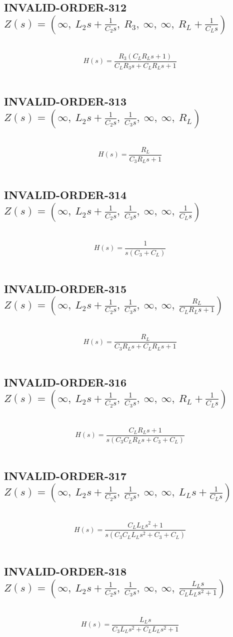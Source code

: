 \documentclass{article}
\begin{document}
\subsection{INVALID-ORDER-312 $Z(s) = \left( \infty, \  L_{2} s + \frac{1}{C_{2} s}, \  R_{3}, \  \infty, \  \infty, \  R_{L} + \frac{1}{C_{L} s}\right)$ } \ 
\textbf{\[H(s) = \frac{R_{3} \left(C_{L} R_{L} s + 1\right)}{C_{L} R_{3} s + C_{L} R_{L} s + 1}\] } \ 
\subsection{INVALID-ORDER-313 $Z(s) = \left( \infty, \  L_{2} s + \frac{1}{C_{2} s}, \  \frac{1}{C_{3} s}, \  \infty, \  \infty, \  R_{L}\right)$ } \ 
\textbf{\[H(s) = \frac{R_{L}}{C_{3} R_{L} s + 1}\] } \ 
\subsection{INVALID-ORDER-314 $Z(s) = \left( \infty, \  L_{2} s + \frac{1}{C_{2} s}, \  \frac{1}{C_{3} s}, \  \infty, \  \infty, \  \frac{1}{C_{L} s}\right)$ } \ 
\textbf{\[H(s) = \frac{1}{s \left(C_{3} + C_{L}\right)}\] } \ 
\subsection{INVALID-ORDER-315 $Z(s) = \left( \infty, \  L_{2} s + \frac{1}{C_{2} s}, \  \frac{1}{C_{3} s}, \  \infty, \  \infty, \  \frac{R_{L}}{C_{L} R_{L} s + 1}\right)$ } \ 
\textbf{\[H(s) = \frac{R_{L}}{C_{3} R_{L} s + C_{L} R_{L} s + 1}\] } \ 
\subsection{INVALID-ORDER-316 $Z(s) = \left( \infty, \  L_{2} s + \frac{1}{C_{2} s}, \  \frac{1}{C_{3} s}, \  \infty, \  \infty, \  R_{L} + \frac{1}{C_{L} s}\right)$ } \ 
\textbf{\[H(s) = \frac{C_{L} R_{L} s + 1}{s \left(C_{3} C_{L} R_{L} s + C_{3} + C_{L}\right)}\] } \ 
\subsection{INVALID-ORDER-317 $Z(s) = \left( \infty, \  L_{2} s + \frac{1}{C_{2} s}, \  \frac{1}{C_{3} s}, \  \infty, \  \infty, \  L_{L} s + \frac{1}{C_{L} s}\right)$ } \ 
\textbf{\[H(s) = \frac{C_{L} L_{L} s^{2} + 1}{s \left(C_{3} C_{L} L_{L} s^{2} + C_{3} + C_{L}\right)}\] } \ 
\subsection{INVALID-ORDER-318 $Z(s) = \left( \infty, \  L_{2} s + \frac{1}{C_{2} s}, \  \frac{1}{C_{3} s}, \  \infty, \  \infty, \  \frac{L_{L} s}{C_{L} L_{L} s^{2} + 1}\right)$ } \ 
\textbf{\[H(s) = \frac{L_{L} s}{C_{3} L_{L} s^{2} + C_{L} L_{L} s^{2} + 1}\] } \ 
\end{document}
